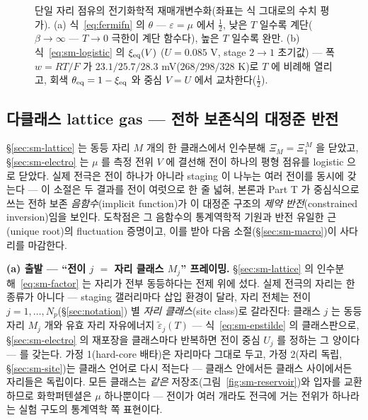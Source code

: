 \begin{figure}[t]
{%
}
\caption{단일 자리 점유의 전기화학적 재매개변수화(좌표는 식 그대로의 수치 평가). (a) 식~\eqref{eq:fermifn} 의
$\theta$ --- $\varepsilon=\mu$ 에서 $\tfrac12$, 낮은 $T$ 일수록 계단($\beta\to\infty$ --- $T\to0$ 극한이
계단 함수다), 높은 $T$ 일수록 완만. (b) 식~\eqref{eq:sm-logistic} 의 $\xi_{\mathrm{eq}}(V)$ ($U=0.085$ V, stage
$2\!\to\!1$ 초기값) --- 폭 $w=RT/F$ 가 $23.1/25.7/28.3$ mV($268/298/328$ K)로 $T$ 에 비례해 열리고, 회색
$\theta_{\mathrm{eq}}=1-\xi_{\mathrm{eq}}$ 와 중심 $V=U$ 에서 교차한다($\tfrac12$).}
\label{fig:sm-occ}
\end{figure}

\subsection{다클래스 lattice gas --- 전하 보존식의 대정준 반전}\label{sec:sm-mc}
\S\ref{sec:sm-lattice} 는 동등 자리 $M$ 개의 한 클래스에서 인수분해 $\Xi_M=\Xi_1^{\,M}$ 을 닫았고,
\S\ref{sec:sm-electro} 는 $\mu$ 를 측정 전위 $V$ 에 결선해 전이 하나의 평형 점유를 logistic 으로 닫았다.
실제 전극은 전이 하나가 아니라 staging 이 나누는 여러 전이를 동시에 갖는다 --- 이 소절은 두 결과를 전이
여럿으로 한 줄 넓혀, 본론과 Part T 가 중심식으로 쓰는 전하 보존 \emph{음함수}(implicit function)가 이 대정준 구조의
\emph{제약 반전}(constrained inversion)임을 보인다. 도착점은 그 음함수의 통계역학적 기원과 반전 유일한 근(unique root)의
fluctuation 증명이고, 이를 받아 다음 소절(\S\ref{sec:sm-macro})이 사다리를 마감한다.

\textbf{(a) 출발 --- ``전이 $j$ $=$ 자리 클래스 $M_j$'' 프레이밍.} \S\ref{sec:sm-lattice} 의
인수분해~\eqref{eq:sm-factor} 는 자리가 전부 동등하다는 전제 위에 섰다. 실제 전극의 자리는 한 종류가 아니다
--- staging 갤러리마다 삽입 환경이 달라, 자리 전체는 전이 $j=1,\dots,N_p$(\S\ref{sec:notation}) 별
\emph{자리 클래스}(site class)로 갈라진다: 클래스 $j$ 는 동등 자리 $M_j$ 개와 유효 자리 자유에너지
$\tilde\varepsilon_j(T)$ --- 식~\eqref{eq:sm-epstilde} 의 클래스판으로, \S\ref{sec:sm-electro} 의 재포장을
클래스마다 반복하면 전이 중심 $U_j$ 를 정하는 그 양이다 --- 를 갖는다. 가정 1(hard-core 배타)은 자리마다
그대로 두고, 가정 2(자리 독립, \S\ref{sec:sm-site})는 클래스 언어로 다시 적는다 --- 클래스 안에서든 클래스
사이에서든 자리들은 독립이다. 모든 클래스는 \emph{같은} 저장조(그림~\ref{fig:sm-reservoir})와 입자를
교환하므로 화학퍼텐셜은 $\mu$ 하나뿐이다 --- 전이가 여러 개라도 전극에 거는 전위가 하나라는 실험
구도의 통계역학 쪽 표현이다.

